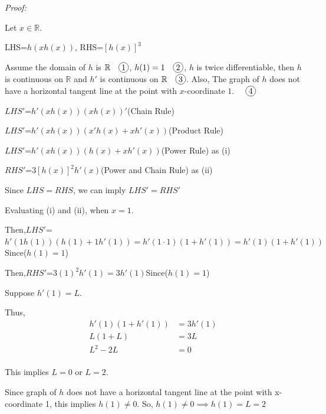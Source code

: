 \documentclass[12pt]{exam}
\newcommand {\DS} [1] {${\displaystyle #1}$}
\newcommand{\R}{\mathbb{R}}
\newcommand*\circled[1]{\tikz[baseline=(char.base)]{
    \node[shape=circle, draw, inner sep=1pt, 
        minimum height=12pt] (char) {#1};}}
\begin{document}
\begin{enumerate}[resume]
	\emph{Proof:}

	Let $x\in\R$.

	LHS=$h(xh(x))$, RHS=$[h(x)]^3$

	Assume the domain of $h$ is $\R \quad \circled{1}$, $h(1)=1 \quad \circled{2}$,
	$h$ is twice differentiable, 
	then $h$ is continuous on $\R$ and $h'$ is continuous on $\R \quad \circled{3}$.
	Also, The graph of $h$ does not have a horizontal tangent line at the point with $x$-coordinate $1$. $\quad \circled{4}$

	\DS{LHS'}=$h'(xh(x))(xh(x))'$\qquad(Chain Rule)

	\DS{LHS'}=$h'(xh(x))(x'h(x)+xh'(x))$\qquad(Product Rule)

	\DS{LHS'}=$h'(xh(x))(h(x)+xh'(x))$\qquad(Power Rule) as \quad (i)

	\DS{RHS'}=$3[h(x)]^2h'(x)$\qquad(Power and Chain Rule) as \quad (ii)

	Since $LHS=RHS$, we can imply $LHS'=RHS'$

	Evaluating (i) and (ii), when $x=1$. 

	Then,\DS{LHS'}=$h'(1h(1))(h(1)+1h'(1))=h'(1\cdot1)(1+h'(1))=h'(1)(1+h'(1))$\qquad Since($h(1)=1$)

	Then,\DS{RHS'}=$3(1)^2h'(1)=3h'(1)$\qquad Since($h(1)=1$)

	Suppose $h'(1)=L.$

	Thus,
	\begin{align*}
	    h'(1)(1+h'(1))&=3h'(1) \\
	    L(1+L)&=3L \\
	    L^2-2L&=0 \\
	\end{align*}


	This implies $L=0$ or $L=2.$

	Since graph of $h$ does not have a horizontal tangent line at the point with x-coordinate 1, this implies $h(1)\neq0$.
	So, $h(1)\neq 0 \implies h(1)=L=2$\\


\end{enumerate}
\end{document}

